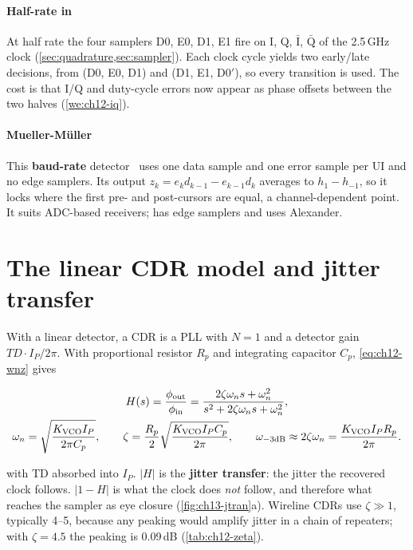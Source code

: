 \paragraph{Half-rate in \OS{}} At half rate the four samplers D0, E0, D1, E1 fire on I, Q, $\bar{\mathrm{I}}$, $\bar{\mathrm{Q}}$ of the 2.5\,GHz clock (\cref{sec:quadrature,sec:sampler}). Each clock cycle yields two early/late decisions, from (D0, E0, D1) and (D1, E1, D0$'$), so every transition is used. The cost is that I/Q and duty-cycle errors now appear as phase offsets between the two halves (\cref{we:ch12-iq}).

\paragraph{Mueller-M\"uller} This \textbf{baud-rate} detector~\cite{p5:mueller1976} uses one data sample and one error sample per UI and no edge samplers. Its output $z_k = e_k d_{k-1} - e_{k-1}d_k$ averages to $h_1 - h_{-1}$, so it locks where the first pre- and post-cursors are equal, a channel-dependent point. It suits ADC-based receivers; \OS{} has edge samplers and uses Alexander.

\section{The linear CDR model and jitter transfer}\label{sec:ch13-linear}

With a linear detector, a CDR is a PLL with $N = 1$ and a detector gain $TD\cdot I_P/2\pi$. With proportional resistor $R_p$ and integrating capacitor $C_p$, \cref{eq:ch12-wnz} gives
\begin{keyeq}
\begin{equation}
\begin{gathered}
  H(s) = \frac{\phi_\mathrm{out}}{\phi_\mathrm{in}} = \frac{2\zeta\omega_n s + \omega_n^2}{s^2 + 2\zeta\omega_n s + \omega_n^2}, \\
  \omega_n = \sqrt{\frac{K_\mathrm{VCO} I_P}{2\pi C_p}}, \qquad
  \zeta = \frac{R_p}{2}\sqrt{\frac{K_\mathrm{VCO} I_P C_p}{2\pi}}, \qquad
  \omega_{-3\mathrm{dB}} \approx 2\zeta\omega_n = \frac{K_\mathrm{VCO} I_P R_p}{2\pi} .
\end{gathered}
  \label{eq:ch13-lin}
\end{equation}
\end{keyeq}
with TD absorbed into $I_P$. $|H|$ is the \textbf{jitter transfer}: the jitter the recovered clock follows. $|1 - H|$ is what the clock does \emph{not} follow, and therefore what reaches the sampler as eye closure (\cref{fig:ch13-jtran}a). Wireline CDRs use $\zeta \gg 1$, typically 4--5, because any peaking would amplify jitter in a chain of repeaters; with $\zeta = 4.5$ the peaking is 0.09\,dB (\cref{tab:ch12-zeta}).

